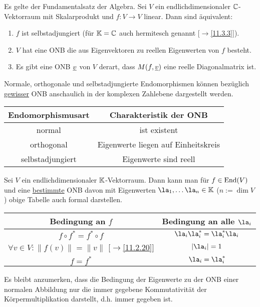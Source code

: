 \documentclass[../../main.tex]{subfiles}
\begin{document}
\begin{sat}\label{15.2.7}
Es gelte der Fundamentalsatz der Algebra. Sei $V$ ein endlichdimensionaler $\mathbb C$-Vektorraum mit Skalarprodukt und $f: V\to V$ linear. Dann sind äquivalent:
\begin{enumerate}[\normalfont(a)]
\item $f$ ist selbstadjungiert (für $\mathbb K=\mathbb C$ auch hermitesch genannt [$\to$\ref{11.3.3}]).
\item $V$ hat eine ONB die aus Eigenvektoren zu reellen Eigenwerten von $f$ besteht.
\item Es gibt eine ONB ${\underline v}$ von $V$ derart, dass $M(f,{\underline v})$ eine reelle Diagonalmatrix ist.
\end{enumerate}
\end{sat}

\begin{ans}
Normale, orthogonale und selbstadjungierte Endomorphismen können bezüglich \underline{gewisser} ONB anschaulich in der komplexen Zahlebene dargestellt werden.
\begin{center}
\begin{tabular}{c|c}
\textbf{Endomorphismusart} & \textbf{Charakteristik der ONB}\\
\hline
normal & ist existent\\
orthogonal & Eigenwerte liegen auf Einheitskreis\\
selbstadjungiert & Eigenwerte sind reell
\end{tabular}
\end{center}
Sei $V$ ein endlichdimensionaler $\mathbb K$-Vektorraum. Dann kann man für $f\in\operatorname{End}(V)$ und eine \underline{bestimmte} ONB davon mit Eigenwerten $\la_1,\ldots \la_n\in \K$ ($n:=\dim V$) obige Tabelle auch formal darstellen.
\begin{center}
\begin{tabular}{c|c}
\textbf{Bedingung an $f$} & \textbf{Bedingung an alle $\la_i$}\\
\hline
$f\circ f^*=f^*\circ f$ & $\la_i\la_i^*=\la_i^*\la_i$\\
$\forall v\in V: \| f(v)\|=\|v\|$ [$\to$\ref{11.2.20}] & $\vert \la_i\vert=1$\\
$f=f^*$ & $\la_i=\la_i^*$
\end{tabular}
\end{center}
Es bleibt anzumerken, dass die Bedingung der Eigenwerte zu der ONB einer normalen Abbildung nur die immer gegebene Kommutativität der Körpermultiplikation darstellt, d.h. immer gegeben ist.
\end{ans}
\end{document}
